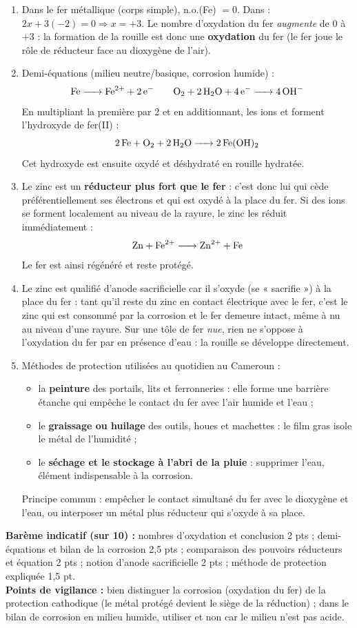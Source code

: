 \documentclass[11pt]{article}
\newcommand{\cle}[1]{{\popxbold\color{popdark}#1}}
\begin{document}
\begin{corrige}
\begin{enumerate}
\item Dans le fer métallique  (corps simple), n.o.(Fe) $= 0$. Dans  : $2x + 3(-2) = 0 \Rightarrow x = +3$. Le nombre d'oxydation du fer \emph{augmente} de $0$ à $+3$ : la formation de la rouille est donc une \textbf{oxydation} du fer (le fer joue le rôle de réducteur face au dioxygène de l'air).
\item Demi-équations (milieu neutre/basique, corrosion humide) :
\[ \ce{Fe -> Fe^2+ + 2 e-} \qquad \ce{O2 + 2 H2O + 4 e- -> 4 OH-} \]
En multipliant la première par 2 et en additionnant, les ions  et  forment l'hydroxyde de fer(II) :
\[ \ce{2 Fe + O2 + 2 H2O -> 2 Fe(OH)2} \]
Cet hydroxyde est ensuite oxydé et déshydraté en rouille  hydratée.
\item Le zinc est un \textbf{réducteur plus fort que le fer} : c'est donc lui qui cède préférentiellement ses électrons et qui est oxydé à la place du fer. Si des ions  se forment localement au niveau de la rayure, le zinc les réduit immédiatement :
\[ \ce{Zn + Fe^2+ -> Zn^2+ + Fe} \]
Le fer est ainsi régénéré et reste protégé.
\item Le zinc est qualifié d'\cle{anode sacrificielle} car il s'oxyde (se « sacrifie ») à la place du fer : tant qu'il reste du zinc en contact électrique avec le fer, c'est le zinc qui est consommé par la corrosion et le fer demeure intact, même à nu au niveau d'une rayure. Sur une tôle de fer \emph{nue}, rien ne s'oppose à l'oxydation du fer par  en présence d'eau : la rouille se développe directement.
\item Méthodes de protection utilisées au quotidien au Cameroun :
\begin{itemize}
\item la \textbf{peinture} des portails, lits et ferronneries : elle forme une barrière étanche qui empêche le contact du fer avec l'air humide et l'eau ;
\item le \textbf{graissage ou huilage} des outils, houes et machettes : le film gras isole le métal de l'humidité ;
\item le \textbf{séchage et le stockage à l'abri de la pluie} : supprimer l'eau, élément indispensable à la corrosion.
\end{itemize}
Principe commun : empêcher le contact simultané du fer avec le dioxygène et l'eau, ou interposer un métal plus réducteur qui s'oxyde à sa place.
\end{enumerate}
\textbf{Barème indicatif (sur 10) :} nombres d'oxydation et conclusion 2 pts ; demi-équations et bilan de la corrosion 2,5 pts ; comparaison des pouvoirs réducteurs et équation 2 pts ; notion d'anode sacrificielle 2 pts ; méthode de protection expliquée 1,5 pt.\\
\textbf{Points de vigilance :} bien distinguer la corrosion (oxydation du fer) de la protection cathodique (le métal protégé devient le siège de la réduction) ; dans le bilan de corrosion en milieu humide, utiliser  et non  car le milieu n'est pas acide.
\end{corrige}
\end{document}
